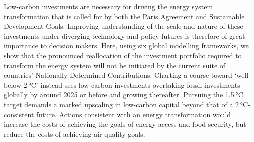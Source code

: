 Low-carbon investments are necessary for driving the energy system transformation that is called for by both the Paris Agreement and Sustainable Development Goals. Improving understanding of the scale and nature of these investments under diverging technology and policy futures is therefore of great importance to decision makers. Here, using six global modelling frameworks, we show that the pronounced reallocation of the investment portfolio required to transform the energy system will not be initiated by the current suite of countries’ Nationally Determined Contributions. Charting a course toward ‘well below 2 °C’ instead sees low-carbon investments overtaking fossil investments globally by around 2025 or before and growing thereafter. Pursuing the 1.5 °C target demands a marked upscaling in low-carbon capital beyond that of a 2 °C-consistent future. Actions consistent with an energy transformation would increase the costs of achieving the goals of energy access and food security, but reduce the costs of achieving air-quality goals.
